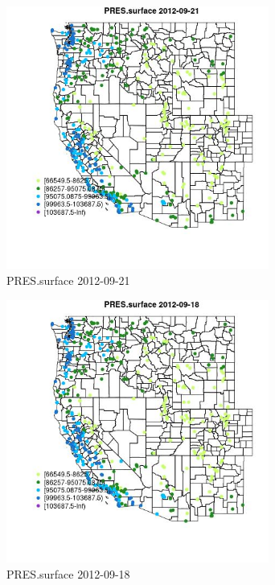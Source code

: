 \begin{figure} 
\centering  
\includegraphics[width=0.77\textwidth]{Code_Outputs/Report_ML_input_PM25_Step4_part_e_de_duplicated_aves_compiled_2019-05-14wNAs_MapObsPRESsurface2012-09-21.jpg} 
\caption{\label{fig:Report_ML_input_PM25_Step4_part_e_de_duplicated_aves_compiled_2019-05-14wNAsMapObsPRESsurface2012-09-21}PRES.surface 2012-09-21} 
\end{figure} 
 

\begin{figure} 
\centering  
\includegraphics[width=0.77\textwidth]{Code_Outputs/Report_ML_input_PM25_Step4_part_e_de_duplicated_aves_compiled_2019-05-14wNAs_MapObsPRESsurface2012-09-18.jpg} 
\caption{\label{fig:Report_ML_input_PM25_Step4_part_e_de_duplicated_aves_compiled_2019-05-14wNAsMapObsPRESsurface2012-09-18}PRES.surface 2012-09-18} 
\end{figure} 
 

